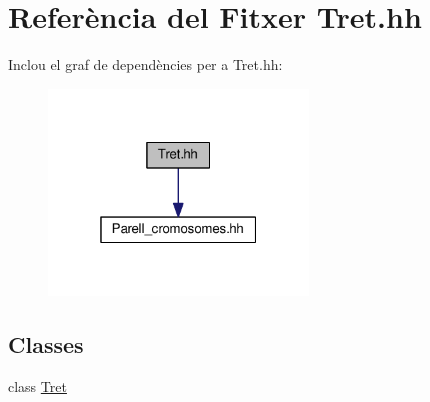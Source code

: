 \hypertarget{_tret_8hh}{}\section{Referència del Fitxer Tret.\+hh}
\label{_tret_8hh}
Inclou el graf de dependències per a Tret.\+hh\+:
\nopagebreak
\begin{figure}[H]
\begin{center}
\leavevmode
\includegraphics[width=196pt]{_tret_8hh__incl}
\end{center}
\end{figure}
\subsection*{Classes}
\begin{DoxyCompactItemize}
\item 
class \hyperlink{class_tret}{Tret}
\end{DoxyCompactItemize}
